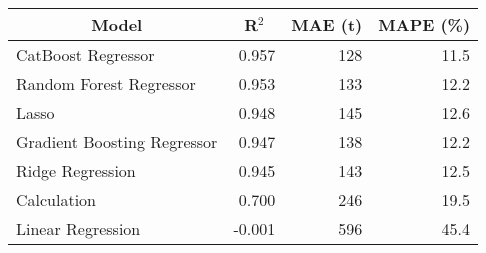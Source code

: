 
\begin{tabular}[t]{lrrr}
\toprule
\multicolumn{1}{c}{Model} & \multicolumn{1}{c}{R$^2$} & \multicolumn{1}{c}{MAE (t)} & \multicolumn{1}{c}{MAPE (\%)}\\
\midrule
CatBoost Regressor & 0.957 & 128 & 11.5\\
Random Forest Regressor & 0.953 & 133 & 12.2\\
Lasso & 0.948 & 145 & 12.6\\
Gradient Boosting Regressor & 0.947 & 138 & 12.2\\
Ridge Regression & 0.945 & 143 & 12.5\\
Calculation & 0.700 & 246 & 19.5\\
Linear Regression & -0.001 & 596 & 45.4\\
\bottomrule
\end{tabular}
